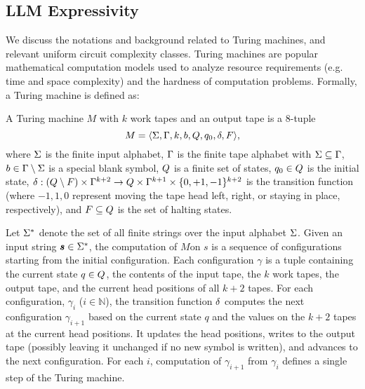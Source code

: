 \subsection{LLM Expressivity}
We discuss the notations and background related to Turing machines, and relevant uniform circuit complexity classes. 
Turing machines are popular mathematical computation models used to analyze resource requirements (e.g. time and space complexity) and the hardness of computation problems.
Formally, a Turing machine is defined as:
\begin{definition}
A Turing machine $M$ with $k$ work tapes and an output tape is a $8$-tuple 
\[
M = \langle \Sigma, \Gamma, k, b, Q, q_{0}, \delta, F \rangle,
\]
where $\Sigma$ is the finite input alphabet, $\Gamma$ is the finite tape alphabet with $\Sigma \subseteq \Gamma$, $b \in \Gamma \setminus \Sigma$ is a special blank symbol, $Q$ is a finite set of states, $q_0 \in Q$ is the initial state, $\delta: \left( Q \setminus F \right) \times \Gamma^{k+2} \to Q \times \Gamma^{k+1} \times \{0, +1, -1 \}^{k+2}$ is the transition function (where $-1, 1, 0$ represent moving the tape head left, right, or staying in place, respectively), and $F \subseteq Q$ is the set of halting states.
\end{definition}

Let $\Sigma^{*} $ denote the set of all finite strings over the input alphabet $\Sigma $. Given an input string $\pmb{s} \in \Sigma^{*} $, the computation of $M $on $s $ is a sequence of configurations starting from the initial configuration. 
Each configuration $\gamma $ is a tuple containing the current state $q \in Q $, the contents of the input tape, the $k$ work tapes, the output tape, and the current head positions of all $k+2$ tapes.  
For each configuration, $\gamma_i$ ($i \in \mathbb{N}$), the transition function $\delta$ computes the next configuration $\gamma_{i+1}$ based on the current state $q$ and the values on the $k+2$ tapes at the current head positions. It updates the head positions, writes to the output tape (possibly leaving it unchanged if no new symbol is written), and advances to the next configuration. 
For each $i$, computation of $\gamma_{i+1}$ from $\gamma_{i}$ defines a single step of the Turing machine.

